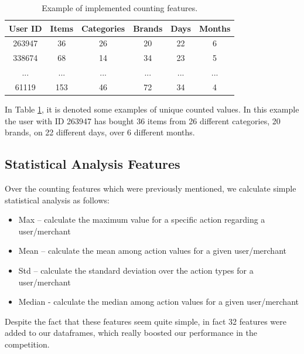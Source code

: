\documentclass{article}
\begin{document}
\begin{table}[htbp]
    \centering
    \setlength{\extrarowheight}{3pt}
    \begin{tabular}{|c|c|c|c|c|c|}
        \hline
        \textbf{User ID} & \textbf{Items} & \textbf{Categories} & \textbf{Brands} & \textbf{Days} & \textbf{Months}\\
        \hline
        263947 & 36 & 26 & 20 & 22 & 6\\
        \hline
        338674 & 68 & 14 & 34 & 23 & 5\\
        \hline
        ... & ... & ... & ... & ... & ...\\
        \hline
        61119 & 153 & 46 & 72 & 34 & 4\\
        \hline
    \end{tabular}
    \vspace{0.3cm}
    \caption{Example of implemented counting features.}
    \label{tab:counters}
\end{table}
\vspace{-0.4cm}

In Table \ref{tab:counters}, it is denoted some examples of unique counted values. In this example the user with ID 263947 has bought 36 items from 26 different categories, 20 brands, on 22 different days, over 6 different months.

\subsection{Statistical Analysis Features}

Over the counting features which were previously mentioned, we calculate simple statistical analysis as follows:

\begin{itemize}
    \item Max – calculate the maximum value for a specific action regarding a user/merchant
    \item Mean – calculate the mean among action values for a given user/merchant
    \item Std – calculate the standard deviation over the action types for a user/merchant
    \item Median - calculate the median among action values for a given user/merchant
\end{itemize}

Despite the fact that these features seem quite simple, in fact 32 features were added to our dataframes, which really boosted our performance in the competition.
\end{document}

